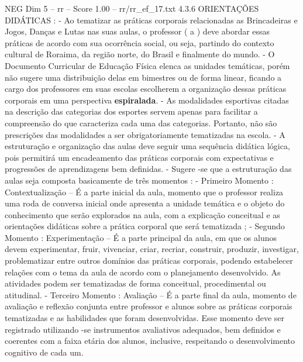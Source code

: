 \begin{textsample}{NEG Dim 5 – rr – Score 1.00 – rr/rr\_ef\_17.txt}  \label{ex:f5_neg_070}
4.3.6 ORIENTAÇÕES DIDÁTICAS : - Ao tematizar as práticas corporais relacionadas as Brincadeiras e Jogos, Danças e Lutas nas suas aulas, o professor ( a ) deve abordar essas práticas de acordo com sua ocorrência social, ou seja, partindo do contexto cultural de Roraima, da região norte, do Brasil e finalmente do mundo. - O Documento Curricular de Educação Física elenca as unidades temáticas, porém não sugere uma distribuição delas em bimestres ou de forma linear, ficando a cargo dos professores em suas escolas escolherem a organização dessas práticas corporais em uma perspectiva \textbf{espiralada}. - As modalidades esportivas citadas na descrição das categorias dos esportes servem apenas para facilitar a compreensão do que caracteriza cada uma das categorias.
Portanto, não são prescrições das modalidades a ser obrigatoriamente tematizadas na escola. - A estruturação e organização das aulas deve seguir uma sequência didática lógica, pois permitirá um encadeamento das práticas corporais com expectativas e progressões de aprendizagens bem definidas. - Sugere -se que a estruturação das aulas seja composta basicamente de três momentos : - Primeiro Momento : Contextualização – É a parte inicial da aula, momento que o professor realiza uma roda de conversa inicial onde apresenta a unidade temática e o objeto do conhecimento que serão explorados na aula, com a explicação conceitual e as orientações didáticas sobre a prática corporal que será tematizada ; - Segundo Momento : Experimentação – É a parte principal da aula, em que os alunos devem experimentar, fruir, vivenciar, criar, recriar, construir, produzir, investigar, problematizar entre outros domínios das práticas corporais, podendo estabelecer relações com o tema da aula de acordo com o planejamento desenvolvido.
As atividades podem ser tematizadas de forma conceitual, procedimental ou atitudinal. - Terceiro Momento : Avaliação – É a parte final da aula, momento de avaliação e reflexão conjunta entre professor e alunos sobre as práticas corporais tematizadas e as habilidades que foram desenvolvidas.
Esse momento deve ser registrado utilizando -se instrumentos avaliativos adequados, bem definidos e coerentes com a faixa etária dos alunos, inclusive, respeitando o desenvolvimento cognitivo de cada um.

\end{textsample}
